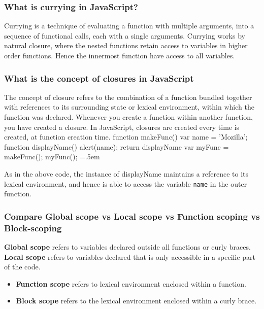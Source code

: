 \documentclass[12pt, a4paper]{article}
\newcommand{\code}[1]{\texttt{#1}}
\newenvironment{lcverbatim}
 {\SaveVerbatim{cverb}}
 {\endSaveVerbatim
  \flushleft\fboxrule=0pt\fboxsep=.5em
  \colorbox{test}{%
    \makebox[\dimexpr\linewidth-2\fboxsep][l]{\BUseVerbatim{cverb}}%
  }
  \endflushleft
}
\begin{document}
\subsubsection*{What is currying in JavaScript?}
Currying is a technique of evaluating a function with multiple arguments, into a sequence of functional calls, each with a single arguments.\newline
Currying works by natural closure, where the nested functions retain access to variables in higher order functions.
Hence the innermost function have access to all variables.

\subsubsection*{What is the concept of closures in JavaScript}
The concept of closure refers to the combination of a function bundled together with references to its surrounding state or lexical environment, within which the function was declared.
Whenever you create a function within another function, you have created a closure.
In JavaScript, closures are created every time is created, at function creation time.
\begin{lcverbatim}
function makeFunc() {
    var name = 'Mozilla';
    function displayName() {
            alert(name);
        }
    return displayName
}
var myFunc = makeFunc();
myFunc();
\end{lcverbatim}

As in the above code, the instance of displayName maintains a reference to its lexical environment, and hence is able to access the variable \code{name} in the outer function.

\subsubsection*{Compare Global scope vs Local scope vs Function scoping vs Block-scoping}
\textbf{Global scope} refers to variables declared outside all functions or curly braces.\newline
\textbf{Local scope} refers to variables declared that is only accessible in a specific part of the code.
\begin{itemize}
    \item \textbf{Function scope} refers to lexical environment enclosed within a function.
    \item \textbf{Block scope} refers to the lexical environment enclosed within a curly brace.
\end{itemize}
\end{document}
